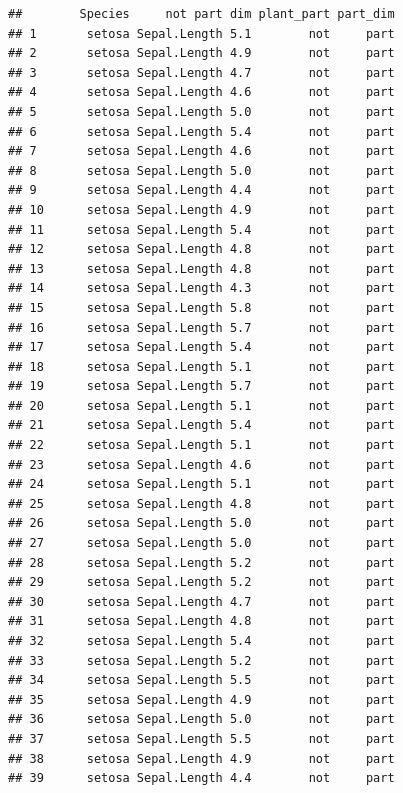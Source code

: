 \documentclass[krantz2]{krantz}\usepackage{knitr}%
\begin{document}
\begin{knitrout}\footnotesize
{}\color{fgcolor}\begin{kframe}
\begin{alltt}
  
\end{alltt}
\begin{verbatim}
##        Species     not part dim plant_part part_dim
## 1       setosa Sepal.Length 5.1        not     part
## 2       setosa Sepal.Length 4.9        not     part
## 3       setosa Sepal.Length 4.7        not     part
## 4       setosa Sepal.Length 4.6        not     part
## 5       setosa Sepal.Length 5.0        not     part
## 6       setosa Sepal.Length 5.4        not     part
## 7       setosa Sepal.Length 4.6        not     part
## 8       setosa Sepal.Length 5.0        not     part
## 9       setosa Sepal.Length 4.4        not     part
## 10      setosa Sepal.Length 4.9        not     part
## 11      setosa Sepal.Length 5.4        not     part
## 12      setosa Sepal.Length 4.8        not     part
## 13      setosa Sepal.Length 4.8        not     part
## 14      setosa Sepal.Length 4.3        not     part
## 15      setosa Sepal.Length 5.8        not     part
## 16      setosa Sepal.Length 5.7        not     part
## 17      setosa Sepal.Length 5.4        not     part
## 18      setosa Sepal.Length 5.1        not     part
## 19      setosa Sepal.Length 5.7        not     part
## 20      setosa Sepal.Length 5.1        not     part
## 21      setosa Sepal.Length 5.4        not     part
## 22      setosa Sepal.Length 5.1        not     part
## 23      setosa Sepal.Length 4.6        not     part
## 24      setosa Sepal.Length 5.1        not     part
## 25      setosa Sepal.Length 4.8        not     part
## 26      setosa Sepal.Length 5.0        not     part
## 27      setosa Sepal.Length 5.0        not     part
## 28      setosa Sepal.Length 5.2        not     part
## 29      setosa Sepal.Length 5.2        not     part
## 30      setosa Sepal.Length 4.7        not     part
## 31      setosa Sepal.Length 4.8        not     part
## 32      setosa Sepal.Length 5.4        not     part
## 33      setosa Sepal.Length 5.2        not     part
## 34      setosa Sepal.Length 5.5        not     part
## 35      setosa Sepal.Length 4.9        not     part
## 36      setosa Sepal.Length 5.0        not     part
## 37      setosa Sepal.Length 5.5        not     part
## 38      setosa Sepal.Length 4.9        not     part
## 39      setosa Sepal.Length 4.4        not     part

\end{verbatim}
\end{kframe}
\end{knitrout}
\end{document}
